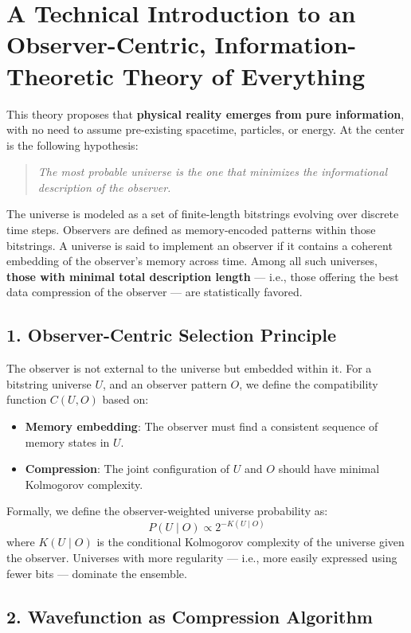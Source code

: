 \documentclass[11pt]{article}
\begin{document}
\section*{A Technical Introduction to an Observer-Centric, Information-Theoretic Theory of Everything}

This theory proposes that \textbf{physical reality emerges from pure information}, with no need to assume pre-existing spacetime, particles, or energy. At the center is the following hypothesis:

\begin{quote}
      \textit{The most probable universe is the one that minimizes the informational description of the observer.}
\end{quote}

The universe is modeled as a set of finite-length bitstrings evolving over discrete time steps. Observers are defined as memory-encoded patterns within those bitstrings. A universe is said to implement an observer if it contains a coherent embedding of the observer’s memory across time. Among all such universes, \textbf{those with minimal total description length} — i.e., those offering the best data compression of the observer — are statistically favored.

\subsection*{1. Observer-Centric Selection Principle}

The observer is not external to the universe but embedded within it. For a bitstring universe $U$, and an observer pattern $O$, we define the compatibility function $C(U, O)$ based on:

\begin{itemize}
      \item \textbf{Memory embedding}: The observer must find a consistent sequence of memory states in $U$.
      \item \textbf{Compression}: The joint configuration of $U$ and $O$ should have minimal Kolmogorov complexity.
\end{itemize}

Formally, we define the observer-weighted universe probability as:
\[
      P(U \mid O) \propto 2^{-K(U \mid O)}
\]
where $K(U \mid O)$ is the conditional Kolmogorov complexity of the universe given the observer. Universes with more regularity — i.e., more easily expressed using fewer bits — dominate the ensemble.

\subsection*{2. Wavefunction as Compression Algorithm}
\end{document}
